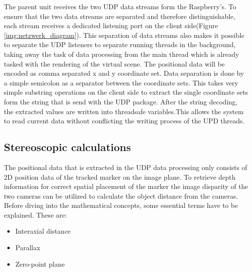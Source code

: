 The parent unit receives the two UDP data streams form the Raspberry's. To ensure that the two data streams are separated and therefore distinguishable, each stream receives a dedicated listening port on the client side(Figure \ref{img:netzwerk_diagram}). This separation of data streams also makes it possible to separate the UDP listeners to separate running threads in the background, taking away the task of data processing from the main thread which is already tasked with the rendering of the virtual scene. The positional data will be encoded as comma separated x and y coordinate set. Data separation is done by a simple semicolon as a separator between the coordinate sets. This takes very simple substring operations on the client side to extract the single coordinate sets form the string that is send with the UDP package.
After the string decoding, the extracted values are written into threadsafe variables.This allows the system to read current data without conflicting the writing process of the UPD threads.
\subsection{Stereoscopic calculations}
The positional data that is extracted in the UDP data processing only consists of 2D position data of the tracked marker on the image plane. To retrieve depth information for correct spatial placement of the marker the image disparity of the two cameras can be utilized to calculate the object distance from the cameras.\cite{Tauer.2010}\\
Before diving into the mathematical concepts, some essential terms have to be explained.
These are:
\begin{itemize}
\item Interaxial distance
\item Parallax
\item Zero-point plane
\end{itemize}
